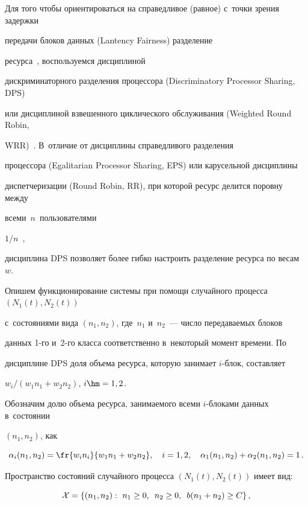 Для того чтобы ориентироваться на справедливое (равное) с~точки зрения задержки 


передачи блоков данных (Lantency Fairness) разделение 


ресурса~\cite{LopezSanchez2023,Kwon2023}, воспользуемся дисциплиной 


дискриминаторного разделения процессора (Discriminatory Processor Sharing, DPS) 


или дисциплиной взвешенного циклического обслуживания (Weighted Round Robin, 


WRR)~\cite{Yashkov1990}. В~отличие от дисциплины справедливого разделения 


процессора (Egalitarian Processor Sharing, EPS) или карусельной дисциплины 


диспетчеризации (Round Robin, RR), при которой ресурс делится поровну между 


всеми~$n$~пользователями 


${1}/{n}$~\cite{Samouylov2010,Shorgin2015,Kochetkova2023,Kochetkova2021a}, 


дисциплина DPS позволяет более гибко настроить разделение ресурса по весам~$w$.


Опишем функционирование системы при помощи случайного процесса $(N_1(t),N_2(t))$ 


с~состояниями вида $(n_1,n_2)$, где~$n_1$ и~$n_2$~--- чис\-ло передаваемых блоков 


данных 1-го и~2-го класса соответственно в~некоторый момент времени. По 


дисциплине DPS доля объема ресурса, которую занимает $i$-блок, составляет


${w_i}/({w_1n_1+w_2n_2})$, $i\hm=1,2$.


Обозначим долю объема ресурса, занимаемого всеми $i$-бло\-ка\-ми данных в~состоянии 


$(n_1,n_2)$, как


\begin{equation*}


\alpha_i(n_1,n_2) = \fr{w_i n_i}{w_1n_1+w_2n_2}, \quad i=1,2, \quad 


\alpha_1(n_1,n_2)+\alpha_2(n_1,n_2)=1\,.


\end{equation*}





Пространство состояний случайного процесса $(N_1(t),N_2(t))$ имеет вид:


\begin{equation*}


\mathcal{X} = \left\{ (n_1,n_2): \ n_1 \geq 0, \enskip n_2 \geq 0, \enskip 


b(n_1+n_2) \geq C \right\},


\end{equation*}



